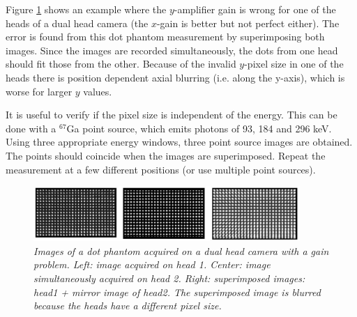 \documentclass[11pt,oneside]{book}
\begin{document}
Figure \ref{fig:qc_gain} shows an example where the $y$-amplifier gain
is wrong for one of the heads of a dual head camera (the $x$-gain is
better but not perfect either). The error is found from this dot
phantom measurement by superimposing both images. Since the images are
recorded simultaneously, the dots from one head should fit those from
the other. Because of the invalid $y$-pixel size in one of the heads
there is position dependent axial blurring (i.e. along the y-axis),
which is worse for larger $y$ values.

It is useful to verify if the pixel size is independent of the energy. This
can be done with a $^{67}$Ga point source, which emits photons of 93, 184 and
296 keV. Using three appropriate energy windows, three point source images are
obtained. The points should coincide when the images are superimposed. Repeat
the measurement at a few different positions (or use multiple point sources).

\begin{figure}[tb]
\centering
\includegraphics[width=0.9\textwidth]{figs/fig_qc_gain.pdf}
\caption{\label{fig:qc_gain} \emph{Images of a dot phantom acquired on a dual
head camera with a gain problem. Left: image acquired on head 1. Center: image
simultaneously acquired on head 2. Right: superimposed images: head1 + mirror
image of head2. The superimposed image is blurred because the heads have a
different pixel size.}}
\end{figure}
\end{document}
